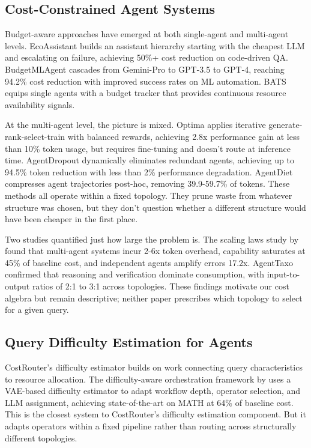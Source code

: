 \subsection{Cost-Constrained Agent Systems}\label{cost-constrained-agent-systems}

Budget-aware approaches have emerged at both single-agent and multi-agent levels. EcoAssistant \cite{zhang_2023_ecoassistant} builds an assistant hierarchy starting with the cheapest LLM and escalating on failure, achieving 50\%+ cost reduction on code-driven QA. BudgetMLAgent \cite{gandhi_2024} cascades from Gemini-Pro to GPT-3.5 to GPT-4, reaching 94.2\% cost reduction with improved success rates on ML automation. BATS \cite{bats_2025} equips single agents with a budget tracker that provides continuous resource availability signals.

At the multi-agent level, the picture is mixed. Optima \cite{chen_2024_optima} applies iterative generate-rank-select-train with balanced rewards, achieving 2.8x performance gain at less than 10\% token usage, but requires fine-tuning and doesn't route at inference time. AgentDropout \cite{wang_2025_agentdropout} dynamically eliminates redundant agents, achieving up to 94.5\% token reduction with less than 2\% performance degradation. AgentDiet \cite{agentdiet_2025} compresses agent trajectories post-hoc, removing 39.9-59.7\% of tokens. These methods all operate within a fixed topology. They prune waste from whatever structure was chosen, but they don't question whether a different structure would have been cheaper in the first place.

Two studies quantified just how large the problem is. The scaling laws study by \cite{scaling_agents_2025} found that multi-agent systems incur 2-6x token overhead, capability saturates at 45\% of baseline cost, and independent agents amplify errors 17.2x. AgentTaxo \cite{agenttaxo_2025} confirmed that reasoning and verification dominate consumption, with input-to-output ratios of 2:1 to 3:1 across topologies. These findings motivate our cost algebra but remain descriptive; neither paper prescribes which topology to select for a given query.

\subsection{Query Difficulty Estimation for Agents}\label{query-difficulty-estimation-for-agents}

CostRouter's difficulty estimator builds on work connecting query characteristics to resource allocation. The difficulty-aware orchestration framework by \cite{song_2025_dao} uses a VAE-based difficulty estimator to adapt workflow depth, operator selection, and LLM assignment, achieving state-of-the-art on MATH at 64\% of baseline cost. This is the closest system to CostRouter's difficulty estimation component. But it adapts operators within a fixed pipeline rather than routing across structurally different topologies.

